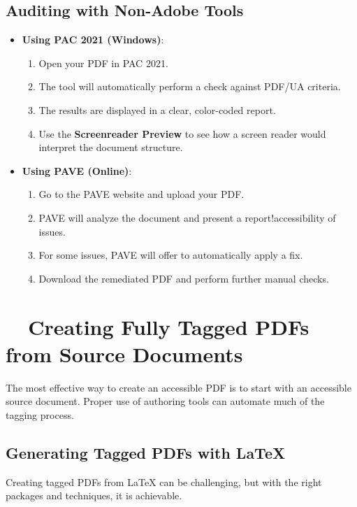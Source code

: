 \subsection{Auditing with Non-Adobe Tools}
\label{subsec:auditing-non-adobe}
\begin{itemize}
	\item \textbf{Using PAC 2021 (Windows)}:
	      \begin{enumerate}
		      \item Open your PDF in PAC 2021.
		      \item The tool will automatically perform a check against PDF/UA criteria.
		      \item The results are displayed in a clear, color-coded report.
		      \item Use the \textbf{Screenreader Preview} to see how a screen reader would interpret the document structure.
	      \end{enumerate}
	\item \textbf{Using PAVE (Online)}:
	      \begin{enumerate}
		      \item Go to the PAVE website and upload your PDF.
		      \item PAVE will analyze the document and present a report!accessibility of issues.
		      \item For some issues, PAVE will offer to automatically apply a fix.
		      \item Download the remediated PDF and perform further manual checks.
	      \end{enumerate}
\end{itemize}

\section{~~Creating Fully Tagged PDFs from Source Documents}
\label{sec:creating-tagged-pdfs}
The most effective way to create an accessible PDF is to start with an accessible source document. Proper use of authoring tools can automate much of the tagging process.

\subsection{Generating Tagged PDFs with LaTeX}
\label{subsec:tagged-pdfs-latex}
Creating tagged PDFs from LaTeX can be challenging, but with the right packages and techniques, it is achievable.

